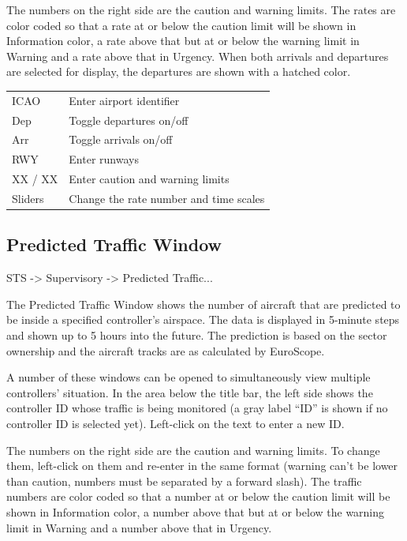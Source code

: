 \documentclass[a4paper,oneside,11pt]{memoir}
\newcommand{\colorref}[1]{\colorbox{Flight Highlight}{\color{#1}#1}}
\newcommand{\winref}[1]{\textit{\titleref{#1}}}
\begin{document}
\bigskip

The numbers on the right side are the caution and warning limits. The rates are color coded so that a rate at or below the caution limit will be shown in \colorref{Information} color, a rate above that but at or below the warning limit in \colorref{Warning} and a rate above that in \colorref{Urgency}. When both arrivals and departures are selected for display, the departures are shown with a hatched color.

\begin{longtable}{p{2.5cm} p{10cm}}
    ICAO        & Enter airport identifier\\
    Dep         & Toggle departures on/off\\
    Arr         & Toggle arrivals on/off\\
    RWY         & Enter runways\\
    XX / XX     & Enter caution and warning limits\\
    Sliders     & Change the rate number and time scales  \\  
\end{longtable}

\subsection{Predicted Traffic Window}
\label{win:ptw}

\winref{menu:global} STS -> Supervisory -> Predicted Traffic...

\bigskip

The Predicted Traffic Window shows the number of aircraft that are predicted to be inside a specified controller’s airspace. The data is displayed in 5-minute steps and shown up to 5 hours into the future. The prediction is based on the sector ownership and the aircraft tracks are as calculated by EuroScope.

\bigskip

A number of these windows can be opened to simultaneously view multiple controllers’ situation. In the area below the title bar, the left side shows the controller ID whose traffic is being monitored (a gray label “ID” is shown if no controller ID is selected yet). Left-click on the text to enter a new ID.

\bigskip

The numbers on the right side are the caution and warning limits. To change them, left-click on them and re-enter in the same format (warning can’t be lower than caution, numbers must be separated by a forward slash). The traffic numbers are color coded so that a number at or below the caution limit will be shown in \colorref{Information} color, a number above that but at or below the warning limit in \colorref{Warning} and a number above that in \colorref{Urgency}.
\end{document}

